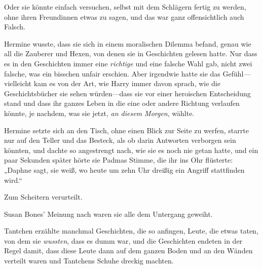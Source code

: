 Oder sie könnte einfach versuchen, selbst mit dem Schlägern fertig zu werden, ohne ihren Freundinnen etwas zu sagen, und das war ganz offensichtlich auch Falsch.

Hermine wusste, dass sie sich in einem moralischen Dilemma befand, genau wie all die Zauberer und Hexen, von denen sie in Geschichten gelesen hatte. Nur dass es in den Geschichten immer eine \emph{richtige} und eine falsche Wahl gab, nicht zwei falsche, was ein bisschen unfair erschien. Aber irgendwie hatte sie das Gefühl—vielleicht kam es von der Art, wie Harry immer davon sprach, wie die Geschichtsbücher sie sehen würden—dass sie vor einer heroischen Entscheidung stand und dass ihr ganzes Leben in die eine oder andere Richtung verlaufen könnte, je nachdem, was sie jetzt, \emph{an diesem Morgen}, wählte.

Hermine setzte sich an den Tisch, ohne einen Blick zur Seite zu werfen, starrte nur auf den Teller und das Besteck, als ob darin Antworten verborgen sein könnten, und dachte so angestrengt nach, wie sie es noch nie getan hatte, und ein paar Sekunden später hörte sie Padmas Stimme, die ihr ins Ohr flüsterte: „Daphne sagt, sie weiß, wo heute um zehn Uhr dreißig ein Angriff stattfinden wird.“

\later

Zum Scheitern verurteilt.

Susan Bones' Meinung nach waren sie alle dem Untergang geweiht.

Tantchen erzählte manchmal Geschichten, die so anfingen, Leute, die etwas taten, von dem sie \emph{wussten}, dass es dumm war, und die Geschichten endeten in der Regel damit, dass diese Leute dann auf dem ganzen Boden und an den Wänden verteilt waren und Tantchens Schuhe dreckig machten.

